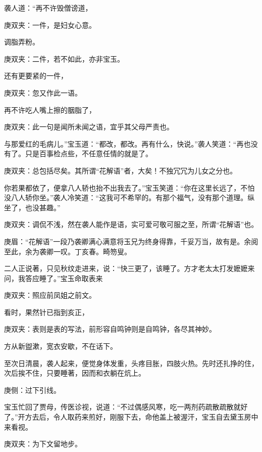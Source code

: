 \begin{parag}
    袭人道：“再不许毁僧谤道，\begin{note}庚双夹：一件，是妇女心意。\end{note}调脂弄粉。\begin{note}庚双夹：二件，若不如此，亦非宝玉。\end{note}还有更要紧的一件，\begin{note}庚双夹：忽又作此一语。\end{note}再不许吃人嘴上擦的胭脂了，\begin{note}庚双夹：此一句是闻所未闻之语，宜乎其父母严责也。\end{note}与那爱红的毛病儿。”宝玉道：“都改，都改。再有什么，快说。”袭人笑道：“再也没有了。只是百事检点些，不任意任情的就是了。\begin{note}庚双夹：总包括尽矣。其所谓“花解语”者，大矣！不独冗冗为儿女之分也。\end{note}你若果都依了，便拿八人轿也抬不出我去了。”宝玉笑道：“你在这里长远了，不怕没八人轿你坐。”袭人冷笑道：“这我可不希罕的。有那个福气，没有那个道理。纵坐了，也没甚趣。”\begin{note}庚双夹：调侃不浅，然在袭人能作是语，实可爱可敬可服之至，所谓“花解语”也。\end{note}\begin{note}庚眉：“花解语”一段乃袭卿满心满意将玉兄为终身得靠，千妥万当，故有是。余阅至此，余为袭卿一叹。丁亥春。畸笏叟。\end{note}
\end{parag}


\begin{parag}
    二人正说著，只见秋纹走进来，说：“快三更了，该睡了。方才老太太打发嬷嬷来问，我答应睡了。”宝玉命取表来\begin{note}庚双夹：照应前凤姐之前文。\end{note}看时，果然针已指到亥正，\begin{note}庚双夹：表则是表的写法，前形容自鸣钟则是自鸣钟，各尽其神妙。\end{note}方从新盥漱，宽衣安歇，不在话下。
\end{parag}


\begin{parag}
    至次日清晨，袭人起来，便觉身体发重，头疼目胀，四肢火热。先时还扎挣的住，次后挨不住，只要睡著，因而和衣躺在炕上。\begin{note}庚侧：过下引线。\end{note}宝玉忙回了贾母，传医诊视，说道：“不过偶感风寒，吃一两剂药疏散疏散就好了。”开方去后，令人取药来煎好，刚服下去，命他盖上被渥汗，宝玉自去黛玉房中来看视。\begin{note}庚双夹：为下文留地步。\end{note}
\end{parag}


